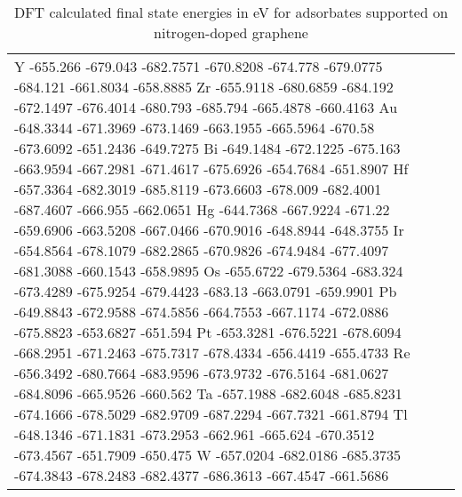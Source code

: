 \begin{table}[h]
\begin{tabular}{lr}
      Y	  -655.266	-679.043	-682.7571	-670.8208	-674.778	-679.0775	-684.121	-661.8034	-658.8885
      Zr	-655.9118	-680.6859	-684.192	-672.1497	-676.4014	-680.793	-685.794	-665.4878	-660.4163
      Au	-648.3344	-671.3969	-673.1469	-663.1955	-665.5964	-670.58		-673.6092	-651.2436	-649.7275
      Bi	-649.1484	-672.1225	-675.163	-663.9594	-667.2981	-671.4617	-675.6926	-654.7684	-651.8907
      Hf	-657.3364	-682.3019	-685.8119	-673.6603	-678.009	-682.4001	-687.4607	-666.955	-662.0651
      Hg	-644.7368	-667.9224	-671.22		-659.6906	-663.5208	-667.0466	-670.9016	-648.8944	-648.3755
      Ir	-654.8564	-678.1079	-682.2865	-670.9826	-674.9484	-677.4097	-681.3088	-660.1543	-658.9895
      Os	-655.6722	-679.5364	-683.324	-673.4289	-675.9254	-679.4423	-683.13		-663.0791	-659.9901
      Pb	-649.8843	-672.9588	-674.5856	-664.7553	-667.1174	-672.0886	-675.8823	-653.6827	-651.594
      Pt	-653.3281	-676.5221	-678.6094	-668.2951	-671.2463	-675.7317	-678.4334	-656.4419	-655.4733
      Re	-656.3492	-680.7664	-683.9596	-673.9732	-676.5164	-681.0627	-684.8096	-665.9526	-660.562
      Ta	-657.1988	-682.6048	-685.8231	-674.1666	-678.5029	-682.9709	-687.2294	-667.7321	-661.8794
      Tl	-648.1346	-671.1831	-673.2953	-662.961	-665.624	-670.3512	-673.4567	-651.7909	-650.475
      W	  -657.0204	-682.0186	-685.3735	-674.3843	-678.2483	-682.4377	-686.3613	-667.4547	-661.5686
      \hline
    \end{tabular}
    \caption{DFT calculated final state energies in eV for adsorbates supported on nitrogen-doped graphene}
    \label{si_table5}
\end{table}


